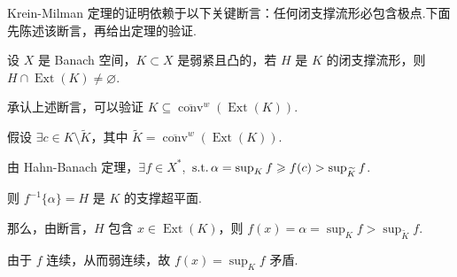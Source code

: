 \begin{figure}[H]
    \centering
    
\end{figure}



Krein-Milman 定理的证明依赖于以下关键断言：任何闭支撑流形必包含极点.下面先陈述该断言，再给出定理的验证.
\begin{claim*}
    设 $X$ 是 Banach 空间，$K\subset X$ 是弱紧且凸的，若 $H$ 是 $K$ 的闭支撑流形，则 $H\cap \operatorname{Ext}(K)\neq \varnothing$.
\end{claim*}

承认上述断言，可以验证 $K\subseteq \overline{\operatorname{conv}}^w(\operatorname{Ext}(K))$.\par
假设 $\exists c\in K\setminus \widetilde{K}$，其中 $\widetilde{K} = \overline{\operatorname{conv}}^w(\operatorname{Ext}(K))$.\par
由 Hahn-Banach 定理，$\exists f\in X^*$, $\operatorname{\,\text{s.t.}} \alpha = \sup_K f \geqslant f(c) > \sup_{\widetilde{K}} f$.\par
则 $f^{-1}\{\alpha\} = H$ 是 $K$ 的支撑超平面.\par
那么，由断言，$H$ 包含 $x\in \operatorname{Ext}(K)$，则 $f(x) = \alpha = \sup_K f > \sup_{\widetilde{K}} f$.\par
由于 $f$ 连续，从而弱连续，故 $f(x) = \sup_K f$ 矛盾.

\begin{figure}[H]
\begin{center}
    
\end{center}
\end{figure}



